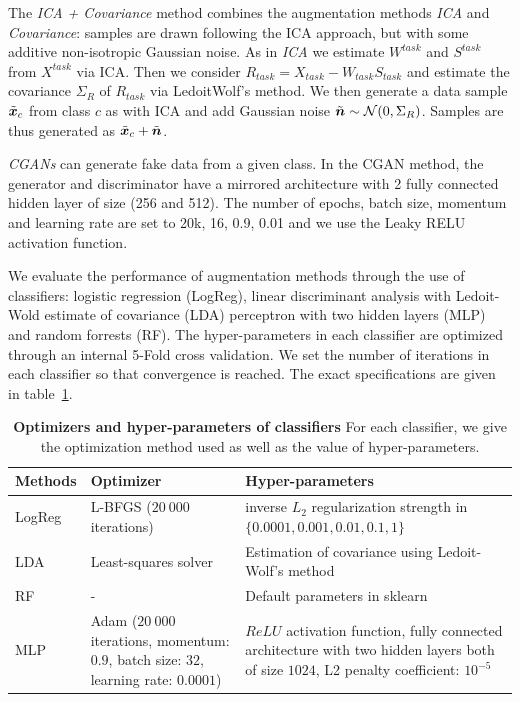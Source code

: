 The \emph{ICA + Covariance} method combines the augmentation
methods \emph{ICA} and \emph{Covariance}: samples are drawn following
the ICA approach, but with some additive non-isotropic Gaussian noise.
%
As in \emph{ICA} we estimate $W^{task}$ and $S^{task}$ from
$X^{task}$ via ICA.
%
Then we consider $R_{task} = X_{task} - W_{task} S_{task}$ and estimate the
covariance $\Sigma_R$ of $R_{task}$ via LedoitWolf's method.
%
We then generate a data sample $\tilde{\boldsymbol{x}}_c$ from class $c$ as with ICA and add
Gaussian noise $\tilde{\boldsymbol{n}} \sim \mathcal{N}(0,\Sigma_R)$.
%
Samples are thus generated as $\tilde{\boldsymbol{x}}_c + \tilde{\boldsymbol{n}}$.

\emph{CGANs} can generate fake data from a given class. In the CGAN method, the generator and discriminator have a mirrored architecture with 2 fully connected hidden layer of size (256 and 512).  The number of epochs, batch size, momentum and learning rate are set to 20k, 16, 0.9, 0.01 and we use the Leaky RELU activation function.

We evaluate the performance of augmentation methods through the use of classifiers: logistic regression (LogReg), linear
discriminant analysis with Ledoit-Wold estimate of covariance (LDA) perceptron
with two hidden layers (MLP) and random forrests (RF).
The hyper-parameters in each classifier are optimized through an internal 5-Fold
cross validation. We set the number of iterations in each classifier so that
convergence is reached. The exact specifications are given in table~\ref{fig:classifiers:tab}.

\begin{table}
  \begin{tabular}{ p{} | p{} |p{}}
\hline
  Methods & Optimizer & Hyper-parameters \\
  \hline
LogReg & L-BFGS \newline ($20~000$ iterations) & inverse $L_2$ regularization
strength \newline in $\{0.0001, 0.001, 0.01, 0.1, 1 \}$ \\
  \hline
LDA  & Least-squares solver & Estimation of covariance \newline using Ledoit-Wolf's
                              method \\
  \hline
  RF &  - &  Default parameters in sklearn \\
  \hline
MLP  & Adam \newline ($20~000$ iterations, \newline momentum: $0.9$, \newline
batch size: $32$, \newline learning
       rate: $0.0001$) & $ReLU$ activation function, fully connected
                         architecture with two hidden layers both of size $1024$, L2
                         penalty coefficient: $10^{-5}$
\caption{\textbf{Optimizers and hyper-parameters of classifiers} For each classifier, we give the optimization method used as well as the value of hyper-parameters.}\label{fig:classifiers:tab} 
\end{tabular}
\end{table}


